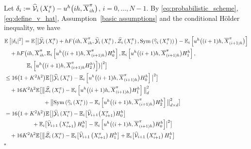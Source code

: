 \documentclass[12pt]{article}
\numberwithin{equation}{section}
\newenvironment{Proof}{\removelastskip\par\medskip \noindent{\em Proof.} \rm}{\penalty-20\null\hfill$\square$\par\medbreak}
\newcommand{\E}{\mathbb{E}}
\begin{document}
\begin{Proof}
  Let $\delta_i := \widehat{\cal V}_{i}\left(X^\pi_i \right) - u^h\big(ih, \overline{X}^\pi_{ih}\big)
  $,
  $i=0,\ldots , N-1$.
By \eqref{eq:probabilistic_scheme}, \eqref{eq:define_v_hat},
Assumption~\ref{basic assumptions} and the conditional H{\"o}lder inequality,
we have
\begin{align*}
&	\E \left[|\delta_i|^2\right] = \E \big[ \bigl\lvert \widehat{\cal Y}_i\left(X^\pi_i \right)
        + h F\big(ih, \overline{X}^\pi_{ih}, \widehat{\cal Y}_i\left(X^\pi_i\right),
        \widehat{\cal Z}_i\left(X^\pi_i\right),{\rm Sym} \left(\widehat{\cal \gamma}_i\left(X^\pi_i\right)\right) \big)
            - \E_i\left[ u^h\big((i+1)h, \overline{X}^\pi_{(i+1)h}\big)\right]  \\
                             & \quad + hF\bigl(ih, \overline{X}^\pi_{ih}, \E_i\left[ u^h\big((i+1)h, \overline{X}^\pi_{(i+1)h}\big)H_0^h\right], \E_i\left[ u^h\big((i+1)h, \overline{X}^\pi_{(i+1)h}\big)H_1^h\right], \\
                             & \qquad\qquad \E_i\left[ u^h\big((i+1)h, \overline{X}^\pi_{(i+1)h}H_2^h\big)\right]\bigr) \bigr\rvert^2\big] \\
		    & \leq 16\big(1 + K^2h^2\big) \E
		    	\big[\big\lvert \widehat{\cal Y}_i\left(X^\pi_i\right)
                - \E_i\left[ u^h\big((i+1)h, \overline{X}^\pi_{(i+1)h}\big)H_0^h\right]\big\rvert^2 \big]  \\
		    & \quad + 16K^2h^2 \E \big[\big\lVert \widehat{\cal Z}_i\left(X^\pi_i\right)
                - \E_i\left[ u^h\big((i+1)h, \overline{X}^\pi_{(i+1)h}\big)H_1^h\right]\big\rVert_d^2  \\
            & \quad \qquad\qquad\qquad + \big\lVert {\rm Sym} \left( \widehat{\cal \gamma}_i\left(X^\pi_i\right) \right)
        -  \E_i\left[ u^h\big((i+1)h, \overline{X}^\pi_{(i+1)h}\big)H_2^h\right]\big\rVert_{d\times d}^2 \big] \\
		    & = 16\big(1 + K^2h^2\big) \E \big[\bigl\lvert \widehat{\cal Y}_i\left(X^\pi_i\right) - \E_i\big[ \widehat{\cal V}_{i+1}\big(X^\pi_{i+1}\big)H_0^h\big] \\
		    & \quad\qquad\qquad + \E_i\big[ \widehat{\cal V}_{i+1}\left(X^\pi_{i+1}\right)H_0^h\big]
    - \E_i\left[ u^h\big((i+1)h, \overline{X}^\pi_{(i+1)h}\big)H_0^h\right]\bigr\rvert^2 \big] \\
		        & \quad + 16K^2h^2 \E \big[ \bigl\lVert \widehat{\cal Z}_i\left(X^\pi_i\right) - \E_i\big[ \widehat{\cal V}_{i+1}\left(X^\pi_{i+1}\right)H_1^h\big]
                          + \E_i\big[ \widehat{\cal V}_{i+1}\left(X^\pi_{i+1}\right)H_1^h\big]

\end{align*}
\end{Proof}
\end{document}
